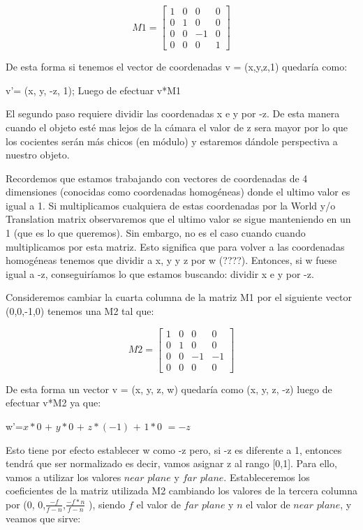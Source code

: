 \documentclass[a4paper]{article}
\newcounter{col}
\begin{document}
\[
M1 =
\begin{bmatrix}
1 & 0 & 0 & 0 \\
0 & 1 & 0 & 0 \\
0 & 0 & -1 & 0 \\
0 & 0 & 0 & 1  
\end{bmatrix}
\]


De esta forma si tenemos el vector de coordenadas v = (x,y,z,1) quedaría como: \newline

v'= (x, y, -z, 1); Luego de efectuar v*M1\newline

El segundo paso requiere dividir las coordenadas x e y por -z. De esta manera cuando el objeto esté mas lejos de la cámara el valor de z sera mayor por lo que los cocientes serán más chicos (en módulo) y estaremos dándole perspectiva a nuestro objeto.
\par Recordemos que estamos trabajando con vectores de coordenadas de 4 dimensiones (conocidas como coordenadas homogéneas) donde el ultimo valor es igual a 1. Si multiplicamos cualquiera de estas coordenadas por la World y/o Translation matrix observaremos que el ultimo valor se sigue manteniendo en un 1 (que es lo que queremos). Sin embargo, no es el caso cuando cuando multiplicamos por esta matriz. Esto significa que para volver a las coordenadas homogéneas tenemos que dividir a x, y y z por w (????). Entonces, si w fuese igual a -z, conseguiríamos lo que estamos buscando: dividir x e y por -z.\newline

Consideremos cambiar la cuarta columna de la matriz M1 por el siguiente vector (0,0,-1,0) tenemos una M2 tal que:

\[
M2 =
\begin{bmatrix}
1 & 0 & 0 & 0 \\
0 & 1 & 0 & 0 \\
0 & 0 & -1 & -1 \\
0 & 0 & 0 & 0 
\end{bmatrix}
\]

De esta forma un vector v = (x, y, z, w) quedaría como (x, y, z, -z) luego de efectuar v*M2 ya que:\newline

w'=$x*0$ $+$ $y*0$ $+$ $z*(-1)$ $+$ $1*0$ $=-z$

Esto tiene por efecto establecer w como -z pero, si -z es diferente a 1, entonces tendrá que ser normalizado es decir, vamos asignar z al rango [0,1]. Para ello, vamos a utilizar los valores $near$ $plane$ y $far$ $plane$. \newline
Estableceremos los coeficientes de la matriz utilizada M2 cambiando los valores de la tercera columna por (0, 0,$\frac{-f}{f-n}$,$\frac{-f*n}{f-n}$ ), siendo $f$ el valor de $far$ $plane$ y $n$ el valor de $near$ $plane$, y veamos que sirve:\newline
\end{document}
